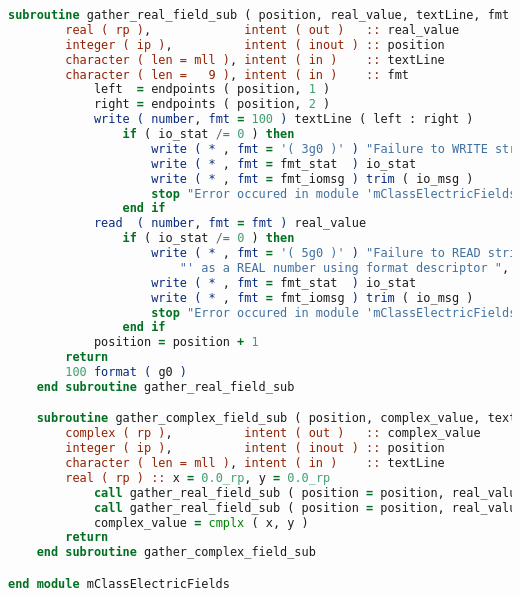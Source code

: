 {{\begin{lstlisting}[language=Fortran]
    subroutine gather_real_field_sub ( position, real_value, textLine, fmt )
        real ( rp ),             intent ( out )   :: real_value
        integer ( ip ),          intent ( inout ) :: position
        character ( len = mll ), intent ( in )    :: textLine
        character ( len =   9 ), intent ( in )    :: fmt
            left  = endpoints ( position, 1 )
            right = endpoints ( position, 2 )
            write ( number, fmt = 100 ) textLine ( left : right )
                if ( io_stat /= 0 ) then
                    write ( * , fmt = '( 3g0 )' ) "Failure to WRITE string value '", trim ( textLine ( left : right ) ) , "'."
                    write ( * , fmt = fmt_stat  ) io_stat
                    write ( * , fmt = fmt_iomsg ) trim ( io_msg )
                    stop "Error occured in module 'mClassElectricFields', subroutine 'gather_real_field_sub'."
                end if
            read  ( number, fmt = fmt ) real_value
                if ( io_stat /= 0 ) then
                    write ( * , fmt = '( 5g0 )' ) "Failure to READ string value '", trim ( textLine ( left : right ) ) , &
                        "' as a REAL number using format descriptor ", fmt, "."
                    write ( * , fmt = fmt_stat  ) io_stat
                    write ( * , fmt = fmt_iomsg ) trim ( io_msg )
                    stop "Error occured in module 'mClassElectricFields', subroutine 'gather_real_field_sub'."
                end if
            position = position + 1
        return
        100 format ( g0 )
    end subroutine gather_real_field_sub

    subroutine gather_complex_field_sub ( position, complex_value, textLine )
        complex ( rp ),          intent ( out )   :: complex_value
        integer ( ip ),          intent ( inout ) :: position
        character ( len = mll ), intent ( in )    :: textLine
        real ( rp ) :: x = 0.0_rp, y = 0.0_rp
            call gather_real_field_sub ( position = position, real_value = x, textLine = textLine, fmt = "( e15.7 )" )
            call gather_real_field_sub ( position = position, real_value = y, textLine = textLine, fmt = "( e15.7 )" )
            complex_value = cmplx ( x, y )
        return
    end subroutine gather_complex_field_sub

end module mClassElectricFields
\end{lstlisting}
}}

\endinput  %

